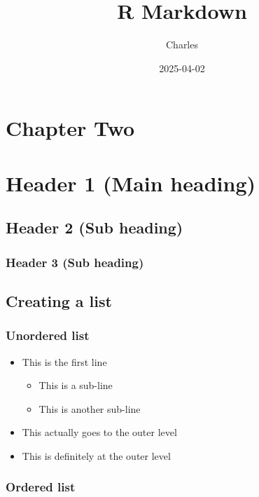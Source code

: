 \documentclass[
]{article}
\title{R Markdown}
\author{Charles}
\date{2025-04-02}
\providecommand{\tightlist}{%
  \setlength{\itemsep}{0pt}\setlength{\parskip}{0pt}}
\begin{document}
\maketitle

{
\setcounter{tocdepth}{2}
\tableofcontents
}
\section{\texorpdfstring{\textbf{Chapter
Two}}{Chapter Two}}\label{chapter-two}

\section{Header 1 (Main heading)}\label{header-1-main-heading}

\subsection{Header 2 (Sub heading)}\label{header-2-sub-heading}

\subsubsection{Header 3 (Sub heading)}\label{header-3-sub-heading}

\subsection{Creating a list}\label{creating-a-list}

\subsubsection{Unordered list}\label{unordered-list}

\begin{itemize}
\tightlist
\item
  This is the first line

  \begin{itemize}
  \tightlist
  \item
    This is a sub-line
  \item
    This is another sub-line
  \end{itemize}
\item
  This actually goes to the outer level
\item
  This is definitely at the outer level
\end{itemize}

\subsubsection{Ordered list}\label{ordered-list}
\end{document}
